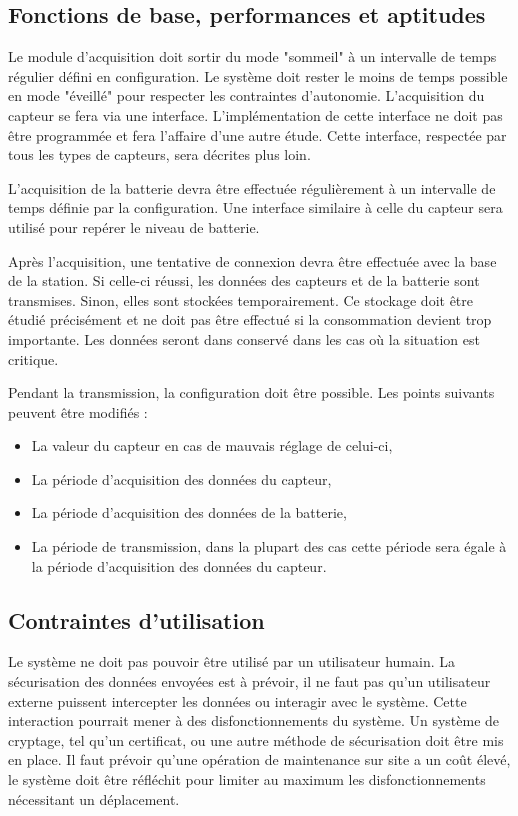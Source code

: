 \subsection{Fonctions de base, performances et aptitudes}

Le module d'acquisition doit sortir du mode "sommeil" à un intervalle de temps régulier défini en configuration. Le système doit rester le moins de temps possible en mode "éveillé" pour respecter les contraintes d'autonomie.
L'acquisition du capteur se fera via une interface. L'implémentation de cette interface ne doit pas être programmée et fera l'affaire d'une autre étude. Cette interface, respectée par tous les types de capteurs, sera décrites plus loin.

L'acquisition de la batterie devra être effectuée régulièrement à un intervalle de temps définie par la configuration. Une interface similaire à celle du capteur sera utilisé pour repérer le niveau de batterie.

Après l'acquisition, une tentative de connexion devra être effectuée avec la base de la station. Si celle-ci réussi, les données des capteurs et de la batterie sont transmises. Sinon, elles sont stockées temporairement. Ce stockage doit être étudié précisément et ne doit pas être effectué si la consommation devient trop importante. Les données seront dans conservé dans les cas où la situation est critique.  

Pendant la transmission, la configuration doit être possible. Les points suivants peuvent être modifiés :
\begin{itemize}
\item La valeur du capteur en cas de mauvais réglage de celui-ci,
\item La période d'acquisition des données du capteur,
\item La période d'acquisition des données de la batterie,
\item La période de transmission, dans la plupart des cas cette période sera égale à la période d'acquisition des données du capteur. 
\end{itemize}

\subsection{Contraintes d'utilisation}

Le système ne doit pas pouvoir être utilisé par un utilisateur humain. La sécurisation des données envoyées est à prévoir, il ne faut pas qu'un utilisateur externe puissent intercepter les données ou interagir avec le système. Cette interaction pourrait mener à des disfonctionnements du système. Un système de cryptage, tel qu'un certificat, ou une autre méthode de sécurisation doit être mis en place.
Il faut prévoir qu'une opération de maintenance sur site a un coût élevé, le système doit être réfléchit pour limiter au maximum les disfonctionnements nécessitant un déplacement. 

